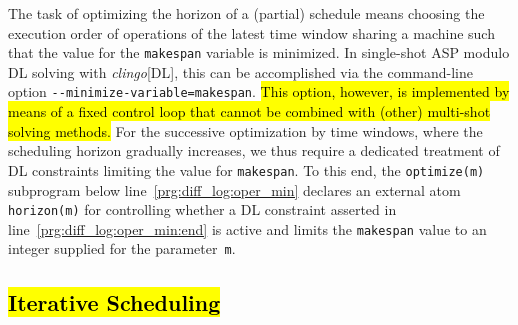 \documentclass{tlp} %
\newcommand{\clingodl}{\emph{clingo}[DL]\xspace}
\begin{document}
The task of optimizing the horizon of a (partial) schedule means choosing
the execution order of operations of the latest time window sharing a machine
such that the value for the \lstinline{makespan} variable is minimized.
In single-shot ASP modulo DL solving with \clingodl, this can be accomplished
via the command-line option \lstinline{--minimize-variable=makespan}.
\hl{This option, however, is implemented by means of a fixed control loop that
cannot be combined with (other) multi-shot solving methods.}
For the successive optimization by time windows, where the scheduling
horizon gradually increases, we thus require a dedicated treatment of DL constraints
limiting the value for \lstinline{makespan}.
To this end, the \lstinline{optimize(m)} subprogram below line~\ref{prg:diff_log:oper_min}
declares an external atom \lstinline{horizon(m)} for controlling whether a DL
constraint asserted in line~\ref{prg:diff_log:oper_min:end} is active and limits
the \lstinline{makespan} value to an integer supplied for the parameter~\lstinline{m}.

\subsection{\hl{Iterative Scheduling}}\label{subsec:scheduling}
\end{document}
